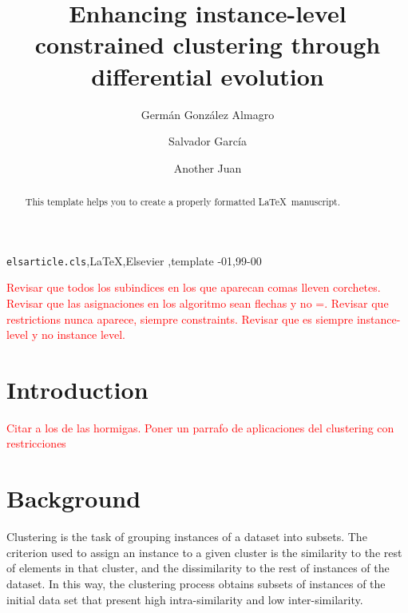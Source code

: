 \documentclass[review]{elsarticle}
\begin{document}
\begin{frontmatter}

\title{Enhancing instance-level constrained clustering through differential evolution}

\author[mymainaddress]{Germ\'an Gonz\'alez Almagro}

\author[mymainaddress]{Salvador Garc\'ia}

\author[mymainaddress]{Another Juan}

\address[mymainaddress]{Department of Computer Science and Artificial Intelligence, University of Granada, 18071 Granada, Spain}

\begin{abstract}
This template helps you to create a properly formatted \LaTeX\ manuscript.
\end{abstract}

\begin{keyword}
\texttt{elsarticle.cls}\sep \LaTeX\sep Elsevier \sep template
-01\sep  99-00
\end{keyword}

\end{frontmatter}

\linenumbers

\textcolor{red}{Revisar que todos los subindices en los que aparecan comas lleven corchetes. Revisar que las asignaciones en los algoritmo sean flechas y no =. Revisar que restrictions nunca aparece, siempre constraints. Revisar que es siempre instance-level y no instance level.}

\section{Introduction}

\textcolor{red}{Citar a los de las hormigas. Poner un parrafo de aplicaciones del clustering con restricciones}

\section{Background}


Clustering is the task of grouping instances of a dataset into subsets. The criterion used to assign an instance to a given cluster is the similarity to the rest of elements in that cluster, and the dissimilarity to the rest of instances of the dataset. In this way, the clustering process obtains subsets of instances of the initial data set that present high intra-similarity and low inter-similarity.
\end{document}
